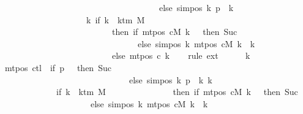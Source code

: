\begin{isabellebody}
\ \ \ \ \ \ \ \ \ \ \ \ \ \ \ \ \ \ \ \ \ \ \ \ \ \ \ \ \ \ \ \ \ \ \ \ \ else\ sim{\isacharunderscore}{\kern0pt}pos\ {\isacharquery}{\kern0pt}k\ {\isacharquery}{\kern0pt}p\ {\isacharplus}{\kern0pt}\ {\isacharquery}{\kern0pt}k{\isacharparenright}{\kern0pt}\isanewline
\ \ \ \ \ \ \ \ \ \ \ \ \ \ \ \ \ \ \ {\isacharequal}{\kern0pt}\ {\isacharparenleft}{\kern0pt}{\isasymlambda}k{\isachardot}{\kern0pt}\ if\ k\ {\isacharless}{\kern0pt}\ k{\isacharunderscore}{\kern0pt}tm\ M\isanewline
\ \ \ \ \ \ \ \ \ \ \ \ \ \ \ \ \ \ \ \ \ \ \ \ \ \ then\ {\isacharparenleft}{\kern0pt}if\ mt{\isacharunderscore}{\kern0pt}pos\ cM\ k\ {\isacharequal}{\kern0pt}\ {}\ then\ Suc\ {}\isanewline
\ \ \ \ \ \ \ \ \ \ \ \ \ \ \ \ \ \ \ \ \ \ \ \ \ \ \ \ \ \ \ \ else\ sim{\isacharunderscore}{\kern0pt}pos\ {\isacharquery}{\kern0pt}k\ {\isacharparenleft}{\kern0pt}mt{\isacharunderscore}{\kern0pt}pos\ cM\ k{\isacharparenright}{\kern0pt}\ {\isacharplus}{\kern0pt}\ {\isacharquery}{\kern0pt}k{\isacharparenright}{\kern0pt}\isanewline
\ \ \ \ \ \ \ \ \ \ \ \ \ \ \ \ \ \ \ \ \ \ \ \ \ \ else\ mt{\isacharunderscore}{\kern0pt}pos\ c{}\ k{\isacharparenright}{\kern0pt}{\isachardoublequoteclose}\isanewline
\ \ \isamarkupfalse%
\ {\isacharparenleft}{\kern0pt}rule\ ext{\isacharparenright}{\kern0pt}\isanewline
\ \ \ \ \isamarkupfalse%
\ k\isanewline
\ \ \ \ \isamarkupfalse%
\ {\isachardoublequoteopen}{\isacharparenleft}{\kern0pt}{\isacharparenleft}{\kern0pt}mt{\isacharunderscore}{\kern0pt}pos\ c{}{\isacharparenright}{\kern0pt}{\isacharparenleft}{\kern0pt}{\isacharquery}{\kern0pt}tl\ {\isacharcolon}{\kern0pt}{\isacharequal}{\kern0pt}\ if\ {\isacharquery}{\kern0pt}p\ {\isacharequal}{\kern0pt}\ {}\ then\ Suc\ {}\isanewline
\ \ \ \ \ \ \ \ \ \ \ \ \ \ \ \ \ \ \ \ \ \ \ \ \ \ \ \ \ \ else\ sim{\isacharunderscore}{\kern0pt}pos\ {\isacharquery}{\kern0pt}k\ {\isacharquery}{\kern0pt}p\ {\isacharplus}{\kern0pt}\ {\isacharquery}{\kern0pt}k{\isacharparenright}{\kern0pt}{\isacharparenright}{\kern0pt}\ k\isanewline
\ \ \ \ \ \ \ \ \ \ \ \ {\isacharequal}{\kern0pt}\ {\isacharparenleft}{\kern0pt}if\ k\ {\isacharless}{\kern0pt}\ k{\isacharunderscore}{\kern0pt}tm\ M\isanewline
\ \ \ \ \ \ \ \ \ \ \ \ \ \ \ then\ {\isacharparenleft}{\kern0pt}if\ mt{\isacharunderscore}{\kern0pt}pos\ cM\ k\ {\isacharequal}{\kern0pt}\ {}\ then\ Suc\ {}\isanewline
\ \ \ \ \ \ \ \ \ \ \ \ \ \ \ \ \ \ \ \ \ else\ sim{\isacharunderscore}{\kern0pt}pos\ {\isacharquery}{\kern0pt}k\ {\isacharparenleft}{\kern0pt}mt{\isacharunderscore}{\kern0pt}pos\ cM\ k{\isacharparenright}{\kern0pt}\ {\isacharplus}{\kern0pt}\ {\isacharquery}{\kern0pt}k{\isacharparenright}{\kern0pt}\isanewline

\end{isabellebody}
